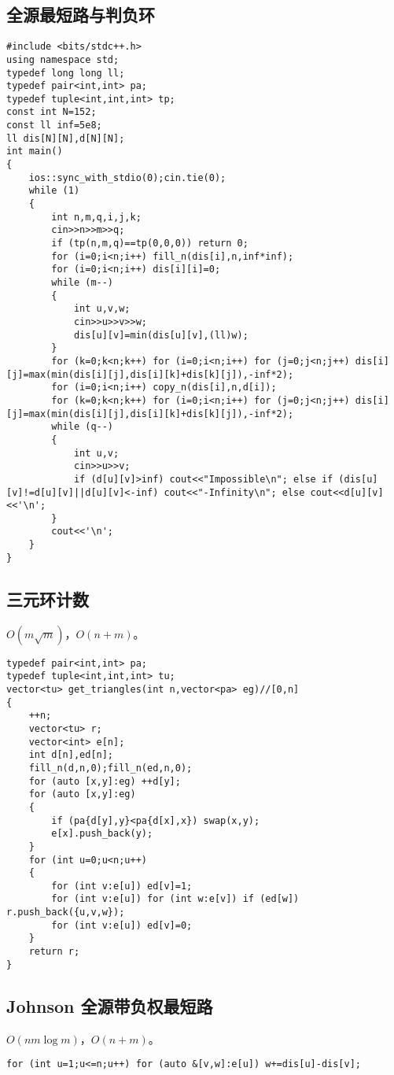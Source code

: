 \documentclass[12pt]{ctexart}
\begin{document}
\subsection{全源最短路与判负环}

\begin{lstlisting}
#include <bits/stdc++.h>
using namespace std;
typedef long long ll;
typedef pair<int,int> pa;
typedef tuple<int,int,int> tp;
const int N=152;
const ll inf=5e8;
ll dis[N][N],d[N][N];
int main()
{
	ios::sync_with_stdio(0);cin.tie(0);
	while (1)
	{
		int n,m,q,i,j,k;
		cin>>n>>m>>q;
		if (tp(n,m,q)==tp(0,0,0)) return 0;
		for (i=0;i<n;i++) fill_n(dis[i],n,inf*inf);
		for (i=0;i<n;i++) dis[i][i]=0;
		while (m--)
		{
			int u,v,w;
			cin>>u>>v>>w;
			dis[u][v]=min(dis[u][v],(ll)w);
		}
		for (k=0;k<n;k++) for (i=0;i<n;i++) for (j=0;j<n;j++) dis[i][j]=max(min(dis[i][j],dis[i][k]+dis[k][j]),-inf*2);
		for (i=0;i<n;i++) copy_n(dis[i],n,d[i]);
		for (k=0;k<n;k++) for (i=0;i<n;i++) for (j=0;j<n;j++) dis[i][j]=max(min(dis[i][j],dis[i][k]+dis[k][j]),-inf*2);
		while (q--)
		{
			int u,v;
			cin>>u>>v;
			if (d[u][v]>inf) cout<<"Impossible\n"; else if (dis[u][v]!=d[u][v]||d[u][v]<-inf) cout<<"-Infinity\n"; else cout<<d[u][v]<<'\n';
		}
		cout<<'\n';
	}
}
\end{lstlisting}

\subsection{三元环计数}

$O(m\sqrt m)$，$O(n+m)$。

\begin{lstlisting}
typedef pair<int,int> pa;
typedef tuple<int,int,int> tu;
vector<tu> get_triangles(int n,vector<pa> eg)//[0,n]
{
	++n;
	vector<tu> r;
	vector<int> e[n];
	int d[n],ed[n];
	fill_n(d,n,0);fill_n(ed,n,0);
	for (auto [x,y]:eg) ++d[y];
	for (auto [x,y]:eg)
	{
		if (pa{d[y],y}<pa{d[x],x}) swap(x,y);
		e[x].push_back(y);
	}
	for (int u=0;u<n;u++)
	{
		for (int v:e[u]) ed[v]=1;
		for (int v:e[u]) for (int w:e[v]) if (ed[w]) r.push_back({u,v,w});
		for (int v:e[u]) ed[v]=0;
	}
	return r;
}
\end{lstlisting}

\subsection{Johnson 全源带负权最短路}

$O(nm\log m)$，$O(n+m)$。

\begin{lstlisting}
for (int u=1;u<=n;u++) for (auto &[v,w]:e[u]) w+=dis[u]-dis[v];
\end{lstlisting}
\end{document}
